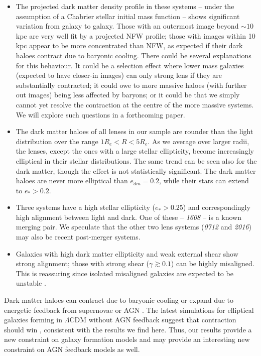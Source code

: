 \documentclass[useAMS,usenatbib]{mn2e}
\begin{document}
\begin{itemize}
\item The projected dark matter density profile in these systems -- under the assumption of a Chabrier stellar initial mass function -- shows significant variation from galaxy to galaxy. Those with an outermost image beyond $\sim 10$\,kpc are very well fit by a projected NFW profile; those with images within 10\,kpc appear to be more concentrated than NFW, as expected if their dark haloes contract due to baryonic cooling. There could be several explanations for this behaviour. It could be a selection effect where lower mass galaxies (expected to have closer-in images) can only strong lens if they are substantially contracted; it could owe to more massive haloes (with further out images) being less affected by baryons; or it could be that we simply cannot yet resolve the contraction at the centre of the more massive systems. We will explore such questions in a forthcoming paper.

\item The dark matter haloes of all lenses in our sample are rounder than the light distribution over the range $1R_e < R < 5R_e$. As we average over larger radii, the lenses, except the ones with a large stellar ellipticity, become increasingly elliptical in their stellar distributions. The same trend can be seen also for the dark matter, though the effect is not statistically significant. The dark matter haloes are never more elliptical than $e_{dm} = 0.2$, while their stars can extend to $e_* > 0.2$.

\item Three systems have a high stellar ellipticity ($e_* > 0.25$) and correspondingly high alignment between light and dark. One of these -- {\it1608} -- is a known merging pair. We speculate that the other two lens systems ({\it0712} and {\it2016}) may also be recent post-merger systems. 

\item Galaxies with high dark matter ellipticity and weak external shear show strong alignment; those with strong shear ($\gamma \gtrsim 0.1$) can be highly misaligned. This is reassuring since isolated misaligned galaxies are expected to be unstable \citep[e.g.][]{1979ApJ...233..872H,1988A&A...206..269M,2007ApJ...670.1027A,2015arXiv150203429D}.

\end{itemize}

Dark matter haloes can contract due to baryonic cooling \citep[e.g.][]{1986ApJ...301...27B} or expand due to energetic feedback from supernovae \citep[e.g.][]{2005MNRAS.356..107R} or AGN \citep[e.g.][]{2012MNRAS.422.3081M}. The latest simulations for elliptical galaxies forming in $\Lambda$CDM without AGN feedback suggest that contraction should win \citep{2015MNRAS.453.2447D}, consistent with the results we find here. Thus, our results provide a new constraint on galaxy formation models and may provide an interesting new constraint on AGN feedback models as well.
\end{document}

